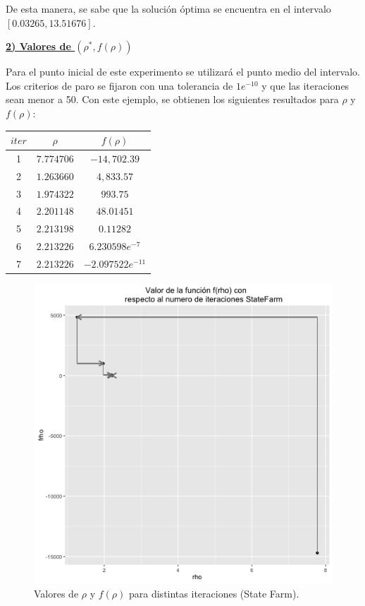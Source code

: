 De esta manera, se sabe que la solución óptima se encuentra en el intervalo $[0.03265, 13.51676]$. 

\pagebreak
\underline{\textbf{2) Valores de $(\rho^*, f(\rho))$}}

Para el punto inicial de este experimento se utilizará el punto medio del intervalo. Los criterios de paro se fijaron con una tolerancia de $1e^{-10}$ y que las iteraciones sean menor a 50. Con este ejemplo, se obtienen los siguientes resultados para $\rho$ y $f(\rho)$:

\begin{center}
\begin{tabular}{ | c | c|  c |} 
\hline
$iter$ & $\rho$ & $f(\rho)$  \\ 
\hline
\hline
1 & $7.774706$ & $-14,702.39$  \\ 
\hline
2 & $1.263660$ & $4,833.57$  \\ 
\hline
3 & $1.974322$ & $993.75$  \\ 
\hline
4 & $2.201148$ & $48.01451$  \\ 
\hline
5 & $2.213198$ & $0.11282$  \\ 
\hline
6 & $2.213226$ & $6.230598e^{-7}$  \\ 
\hline
7 & $2.213226$ & $-2.097522e^{-11}$  \\ 
\hline
\hline

\end{tabular}
\end{center}

\begin{figure}[!ht]
  \centering
	\includegraphics[width=.75\textwidth]{Figures/Chapter4_Iteraciones_StateFarm.png}	
  \caption{Valores de $\rho$ y $f(\rho)$ para distintas iteraciones (State Farm).}
\end{figure}

